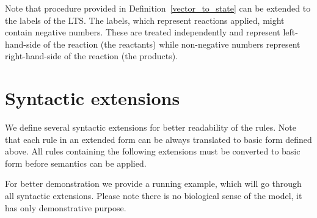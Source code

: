 \documentclass[12pt]{fithesis2}
\begin{document}
Note that procedure provided in Definition~\ref{vector_to_state} can be extended to the labels of the LTS. The labels, which represent reactions applied, might contain negative numbers. These are treated independently and represent left-hand-side of the reaction (the reactants) while non-negative numbers represent right-hand-side of the reaction (the products).

\section{Syntactic extensions}
\label{syntactic_extensions}

We define several syntactic extensions for better readability of the rules. Note that each rule in an extended form can be always translated to basic form defined above. All rules containing the following extensions must be converted to basic form before semantics can be applied.

For better demonstration we provide a running example, which will go through all syntactic extensions. Please note there is no biological sense of the model, it has only demonstrative purpose.
\end{document}
